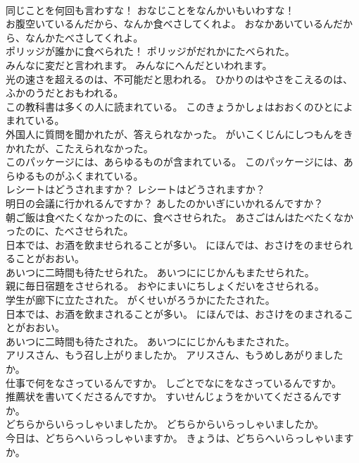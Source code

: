 \documentclass[8pt]{extreport}
\begin{document}
\begin{CJK}{UTF8}{min}
\\	同じことを何回も言わすな！	おなじことをなんかいもいわすな！ 
\\	お腹空いているんだから、なんか食べさしてくれよ。	おなかあいているんだから、なんかたべさしてくれよ。 
\\	ポリッジが誰かに食べられた！	ポリッジがだれかにたべられた。 
\\	みんなに変だと言われます。	みんなにへんだといわれます。 
\\	光の速さを超えるのは、不可能だと思われる。	ひかりのはやさをこえるのは、ふかのうだとおもわれる。 
\\	この教科書は多くの人に読まれている。	このきょうかしょはおおくのひとによまれている。 
\\	外国人に質問を聞かれたが、答えられなかった。	がいこくじんにしつもんをきかれたが、こたえられなかった。 
\\	このパッケージには、あらゆるものが含まれている。	このパッケージには、あらゆるものがふくまれている。 
\\	レシートはどうされますか？	レシートはどうされますか？ 
\\	明日の会議に行かれるんですか？	あしたのかいぎにいかれるんですか？ 
\\	朝ご飯は食べたくなかったのに、食べさせられた。	あさごはんはたべたくなかったのに、たべさせられた。 
\\	日本では、お酒を飲ませられることが多い。	にほんでは、おさけをのませられることがおおい。 
\\	あいつに二時間も待たせられた。	あいつににじかんもまたせられた。 
\\	親に毎日宿題をさせられる。	おやにまいにちしょくだいをさせられる。 
\\	学生が廊下に立たされた。	がくせいがろうかにたたされた。 
\\	日本では、お酒を飲まされることが多い。	にほんでは、おさけをのまされることがおおい。 
\\	あいつに二時間も待たされた。	あいつににじかんもまたされた。 
\\	アリスさん、もう召し上がりましたか。	アリスさん、もうめしあがりましたか。 
\\	仕事で何をなさっているんですか。	しごとでなにをなさっているんですか。 
\\	推薦状を書いてくださるんですか。	すいせんじょうをかいてくださるんですか。 
\\	どちらからいらっしゃいましたか。	どちらからいらっしゃいましたか。 
\\	今日は、どちらへいらっしゃいますか。	きょうは、どちらへいらっしゃいますか。 

\end{CJK}
\end{document}
